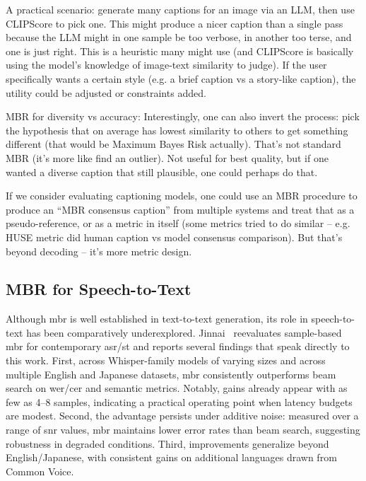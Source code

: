 A practical scenario: generate many captions for an image via an LLM, then use CLIPScore to pick one. This might produce a nicer caption than a single pass because the LLM might in one sample be too verbose, in another too terse, and one is just right. This is a heuristic many might use (and CLIPScore is basically using the model’s knowledge of image-text similarity to judge). If the user specifically wants a certain style (e.g. a brief caption vs a story-like caption), the utility could be adjusted or constraints added.

MBR for diversity vs accuracy: Interestingly, one can also invert the process: pick the hypothesis that on average has lowest similarity to others to get something different (that would be Maximum Bayes Risk actually). That’s not standard MBR (it’s more like find an outlier). Not useful for best quality, but if one wanted a diverse caption that still plausible, one could perhaps do that.

If we consider evaluating captioning models, one could use an MBR procedure to produce an “MBR consensus caption” from multiple systems and treat that as a pseudo-reference, or as a metric in itself (some metrics tried to do similar – e.g. HUSE metric did human caption vs model consensus comparison). But that’s beyond decoding – it’s more metric design.

\fi
\iffalse
\subsection{MBR for Speech-to-Text}
Although \gls{mbr} is well established in text-to-text generation, its role in speech-to-text has been comparatively underexplored. Jinnai~\cite{jinnai2024mbr_asr} reevaluates sample-based \gls{mbr} for contemporary \gls{asr}/\gls{st} and reports several findings that speak directly to this work. First, across Whisper-family models of varying sizes and across multiple English and Japanese datasets, \gls{mbr} consistently outperforms beam search on \gls{wer}/\gls{cer} and semantic metrics. Notably, gains already appear with as few as 4–8 samples, indicating a practical operating point when latency budgets are modest. Second, the advantage persists under additive noise: measured over a range of \gls{snr} values, \gls{mbr} maintains lower error rates than beam search, suggesting robustness in degraded conditions. Third, improvements generalize beyond English/Japanese, with consistent gains on additional languages drawn from Common Voice. 

